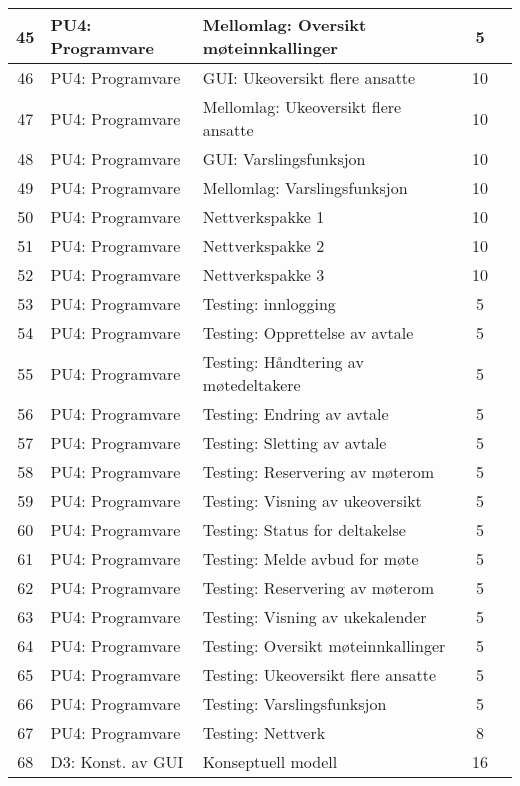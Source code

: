 \begin{longtable}[l]{|c|l|l|c|c|}
	45 & PU4: Programvare & Mellomlag: Oversikt møteinnkallinger  & 5 & \\ \hline
	46 & PU4: Programvare & GUI: Ukeoversikt flere ansatte & 10 & \\ \hline
	47 & PU4: Programvare & Mellomlag: Ukeoversikt flere ansatte  & 10 & \\ \hline
	48 & PU4: Programvare & GUI: Varslingsfunksjon & 10 & \\ \hline
	49 & PU4: Programvare & Mellomlag: Varslingsfunksjon & 10 & \\ \hline
	50 & PU4: Programvare & Nettverkspakke 1 & 10 & \\ \hline
	51 & PU4: Programvare & Nettverkspakke 2 & 10 & \\ \hline
	52 & PU4: Programvare & Nettverkspakke 3 & 10 & \\ \hline
	53 & PU4: Programvare & Testing: innlogging & 5 & \\ \hline
	54 & PU4: Programvare & Testing: Opprettelse av avtale & 5 & \\ \hline
	55 & PU4: Programvare & Testing: Håndtering av møtedeltakere & 5 & \\ \hline
	56 & PU4: Programvare & Testing: Endring av avtale & 5 & \\  \hline
	57 & PU4: Programvare & Testing: Sletting av avtale & 5 & \\ \hline
	58 & PU4: Programvare & Testing: Reservering av møterom & 5 & \\ \hline
	59 & PU4: Programvare & Testing: Visning av ukeoversikt & 5 & \\ \hline
	60 & PU4: Programvare & Testing: Status for deltakelse & 5 & \\ \hline
	61 & PU4: Programvare & Testing: Melde avbud for møte & 5 & \\ \hline
	62 & PU4: Programvare & Testing: Reservering av møterom & 5 & \\ \hline
	63 & PU4: Programvare & Testing: Visning av ukekalender & 5 & \\ \hline
	64 & PU4: Programvare & Testing: Oversikt møteinnkallinger & 5 & \\ \hline
	65 & PU4: Programvare & Testing: Ukeoversikt flere ansatte & 5 & \\ \hline
	66 & PU4: Programvare & Testing: Varslingsfunksjon & 5 & \\ \hline
	67 & PU4: Programvare & Testing: Nettverk & 8 & \\ \hline
	68 & D3: Konst. av GUI & Konseptuell modell & 16 & \\ \hline

\end{longtable}
